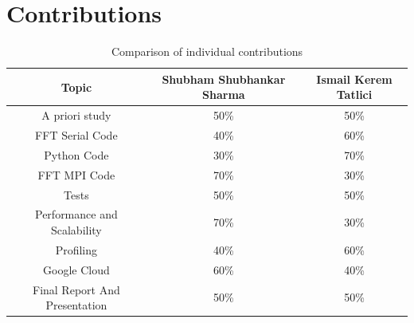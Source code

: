\documentclass{article}
\begin{document}
\section{Contributions}
\begin{table}[h]
    \centering
    \begin{tabular}{|c|c|c|}
        \hline
        \textbf{Topic} & \textbf{Shubham Shubhankar Sharma} & \textbf{Ismail Kerem Tatlici} \\ \hline
        A priori study & 50\% & 50\% \\ \hline
        FFT Serial Code & 40\% & 60\% \\ \hline
        Python Code & 30\% & 70\% \\ \hline
        FFT MPI Code & 70\% & 30\% \\ \hline
        Tests & 50\% & 50\% \\ \hline
        Performance and Scalability & 70\% & 30\% \\ \hline
        Profiling & 40\% & 60\% \\ \hline
        Google Cloud & 60\% & 40\% \\ \hline
        Final Report And Presentation & 50\% & 50\% \\ \hline
    \end{tabular}
    \caption{Comparison of individual contributions}
    \label{table:contributions}
\end{table}

\printbibliography
\end{document}
